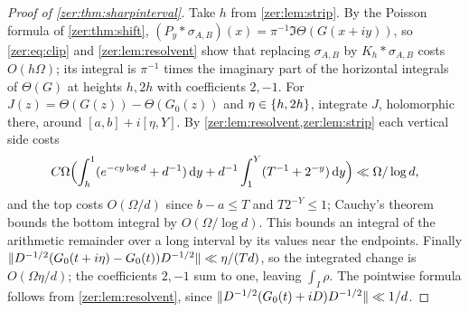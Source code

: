 \begin{proof}[Proof of \cref{zer:thm:sharpinterval}]
Take $h$ from \cref{zer:lem:strip}. By the Poisson formula of \cref{zer:thm:shift},
$(P_y*\sigma_{A,B})(x)=\pi^{-1}\Im\Theta(G(x+iy))$, so \eqref{zer:eq:clip} and \cref{zer:lem:resolvent} show that
replacing $\sigma_{A,B}$ by $K_h*\sigma_{A,B}$ costs $O(h\Omega)$; its integral is $\pi^{-1}$ times the imaginary
part of the horizontal integrals of $\Theta(G)$ at heights $h,2h$ with coefficients $2,-1$. For
$J(z)=\Theta(G(z))-\Theta(G_0(z))$ and $\eta\in\{h,2h\}$, integrate $J$, holomorphic there, around
$[a,b]+i[\eta,Y]$. By \cref{zer:lem:resolvent,zer:lem:strip} each vertical side costs
\[
 C\Omega\Bigl(\int_h^1(e^{-cy\log d}+d^{-1})\,\mathrm{d} y+d^{-1}\int_1^Y(T^{-1}+2^{-y})\,\mathrm{d} y\Bigr)\ll\Omega/\log d,
\]
and the top costs $O(\Omega/d)$ since $b-a\le T$ and $T2^{-Y}\le1$; Cauchy's theorem bounds the bottom
integral by $O(\Omega/\log d)$. This bounds an integral of the arithmetic remainder over a long interval by
its values near the endpoints. Finally $\lVert D^{-1/2}(G_0(t+i\eta)-G_0(t))D^{-1/2}\rVert\ll\eta/(Td)$, so the
integrated change is $O(\Omega\eta/d)$; the coefficients $2,-1$ sum to one, leaving $\int_I\rho$. The pointwise
formula follows from \cref{zer:lem:resolvent}, since $\lVert D^{-1/2}(G_0(t)+iD)D^{-1/2}\rVert\ll1/d$.
\end{proof}

